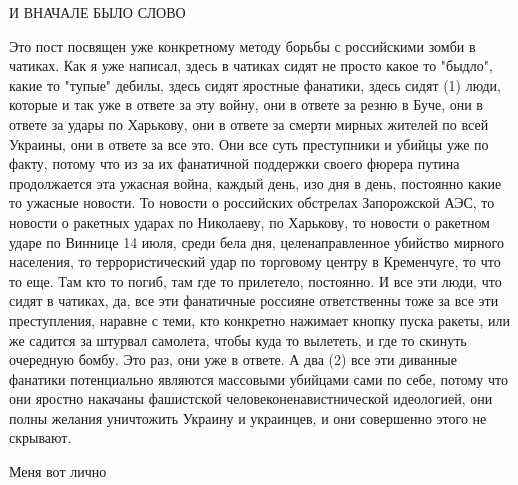  
 
 
 
 

И ВНАЧАЛЕ БЫЛО СЛОВО

Это пост посвящен уже конкретному методу борьбы с российскими зомби в чатиках.
Как я уже написал, здесь в чатиках сидят не просто какое то "быдло", какие то
"тупые" дебилы, здесь сидят яростные фанатики, здесь сидят (1) люди, которые и
так уже в ответе за эту войну, они в ответе за резню в Буче, они в ответе за
удары по Харькову, они в ответе за смерти мирных жителей по всей Украины, они в
ответе за все это. Они все суть преступники и убийцы уже по факту, потому что
из за их фанатичной поддержки своего фюрера путина продолжается эта ужасная
война, каждый день, изо дня в день, постоянно какие то ужасные новости. То
новости о российских обстрелах Запорожской АЭС, то новости о ракетных ударах по
Николаеву, по Харькову, то новости о ракетном ударе по Виннице 14 июля, среди
бела дня, целенаправленное убийство мирного населения, то террористический удар
по торговому центру в Кременчуге, то что то еще.  Там кто то погиб, там где то
прилетело, постоянно. И все эти люди, что сидят в чатиках, да, все эти
фанатичные россияне ответственны тоже за все эти преступления, наравне с теми,
кто конкретно нажимает кнопку пуска ракеты, или же садится за штурвал самолета,
чтобы куда то вылететь, и где то скинуть очередную бомбу. Это раз, они уже в
ответе.  А два (2) все эти диванные фанатики потенциально являются массовыми
убийцами сами по себе, потому что они яростно накачаны фашистской
человеконенавистнической идеологией, они полны желания уничтожить Украину и
украинцев, и они совершенно этого не скрывают. 

Меня вот лично 
